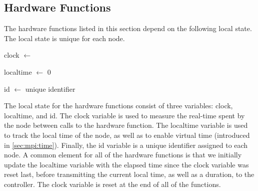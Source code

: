 

\subsection{Hardware Functions}\label{sec:hwfuncspseudo}
The hardware functions listed in this section depend on the following local state. The local state is unique for each node.\smallbreak

clock $\leftarrow$ \Now

localtime $\leftarrow$ 0

id $\leftarrow$ unique identifier 
\smallbreak





%
% 

The local state for the hardware functions consist of three variables: clock, localtime, and id. The clock variable is used to measure the real-time spent by the node between calls to the hardware function. The localtime variable is used to track the local time of the node, as well as to enable virtual time (introduced in \autoref{sec:mpi:time}). Finally, the id variable is a unique identifier assigned to each node. A common element for all of the hardware functions is that we initially update the localtime variable with the elapsed time since the clock variable was reset last, before transmitting the current local time, as well as a duration, to the controller. The clock variable is reset at the end of all of the functions.\medbreak

